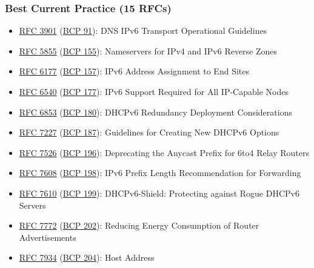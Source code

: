 \documentclass[
]{article}
\providecommand{\tightlist}{%
  \setlength{\itemsep}{0pt}\setlength{\parskip}{0pt}}
\begin{document}
\subsubsection{Best Current Practice (15
RFCs)}\label{best-current-practice-15-rfcs}

\begin{itemize}
\tightlist
\item
  \href{https://www.rfc-editor.org/info/rfc3901}{RFC 3901}
  (\href{https://www.rfc-editor.org/info/bcp91}{BCP 91}): DNS IPv6
  Transport Operational Guidelines
\item
  \href{https://www.rfc-editor.org/info/rfc5855}{RFC 5855}
  (\href{https://www.rfc-editor.org/info/bcp155}{BCP 155}): Nameservers
  for IPv4 and IPv6 Reverse Zones
\item
  \href{https://www.rfc-editor.org/info/rfc6177}{RFC 6177}
  (\href{https://www.rfc-editor.org/info/bcp157}{BCP 157}): IPv6 Address
  Assignment to End Sites
\item
  \href{https://www.rfc-editor.org/info/rfc6540}{RFC 6540}
  (\href{https://www.rfc-editor.org/info/bcp177}{BCP 177}): IPv6 Support
  Required for All IP-Capable Nodes
\item
  \href{https://www.rfc-editor.org/info/rfc6853}{RFC 6853}
  (\href{https://www.rfc-editor.org/info/bcp180}{BCP 180}): DHCPv6
  Redundancy Deployment Considerations
\item
  \href{https://www.rfc-editor.org/info/rfc7227}{RFC 7227}
  (\href{https://www.rfc-editor.org/info/bcp187}{BCP 187}): Guidelines
  for Creating New DHCPv6 Options
\item
  \href{https://www.rfc-editor.org/info/rfc7526}{RFC 7526}
  (\href{https://www.rfc-editor.org/info/bcp196}{BCP 196}): Deprecating
  the Anycast Prefix for 6to4 Relay Routers
\item
  \href{https://www.rfc-editor.org/info/rfc7608}{RFC 7608}
  (\href{https://www.rfc-editor.org/info/bcp198}{BCP 198}): IPv6 Prefix
  Length Recommendation for Forwarding
\item
  \href{https://www.rfc-editor.org/info/rfc7610}{RFC 7610}
  (\href{https://www.rfc-editor.org/info/bcp199}{BCP 199}):
  DHCPv6-Shield: Protecting against Rogue DHCPv6 Servers
\item
  \href{https://www.rfc-editor.org/info/rfc7772}{RFC 7772}
  (\href{https://www.rfc-editor.org/info/bcp202}{BCP 202}): Reducing
  Energy Consumption of Router Advertisements
\item
  \href{https://www.rfc-editor.org/info/rfc7934}{RFC 7934}
  (\href{https://www.rfc-editor.org/info/bcp204}{BCP 204}): Host Address

\end{itemize}
\end{document}
